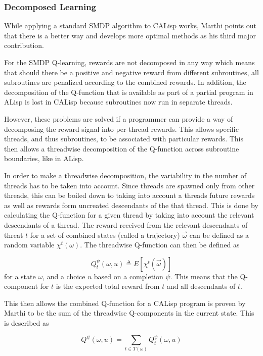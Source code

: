 \documentclass[jair,twoside,11pt,theapa]{article}
\begin{document}
\subsubsection{Decomposed Learning}
While applying a standard SMDP algorithm to CALisp works, Marthi points out that there is a better way and develops more optimal methods as his third major contribution.

For the SMDP Q-learning, rewards are not decomposed in any way which means that should there be a positive and negative reward from different subroutines, all subroutines are penalized according to the combined rewards. In addition, the decomposition of the Q-function that is available as part of a partial program in ALisp is lost in CALisp because subroutines now run in separate threads.

However, these problems are solved if a programmer can provide a way of decomposing the reward signal into per-thread rewards. This allows specific threads, and thus subroutines, to be associated with particular rewards. This then allows a threadwise decomposition of the Q-function across subroutine boundaries, like in ALisp. 

In order to make a threadwise decomposition, the variability in the number of threads has to be taken into account. Since threads are spawned only from other threads, this can be boiled down to taking into account a threads future rewards as well as rewards form uncreated descendants of the that thread. This is done by calculating the Q-function for a given thread by taking into account the relevant descendants of a thread. The reward received from the relevant descendants of threat $t$ for a set of combined states (called a trajectory) $\vec{\omega}$ can be defined as a random variable $\chi ^t(\omega)$. The threadwise Q-function can then be defined as 

\begin{equation}
Q^{\psi}_t (\omega, u) \triangleq E[\chi^t(\vec{\omega})]
\end{equation}  
for a state $\omega$, and a choice $u$ based on a completion $\psi$. This means that the Q-component for $t$ is the expected total reward from $t$ and all descendants of $t$. 

This then allows the combined Q-function for a CALisp program is proven by Marthi to be the sum of the threadwise Q-components in the current state. This is described as 

\begin{equation}
Q^{\psi} (\omega, u) = \sum_{t \in T(\omega)} Q^{\psi}_t (\omega, u) 
\end{equation}  
\end{document}
